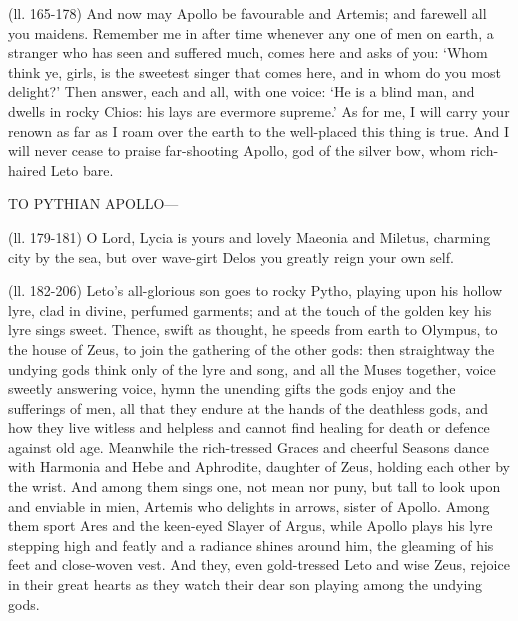 (ll. 165-178) And now may Apollo be favourable and Artemis; and farewell all
you maidens. Remember me in after time whenever any one of men on earth, a
stranger who has seen and suffered much, comes here and asks of you:
‘Whom think ye, girls, is the sweetest singer that comes here, and in
whom do you most delight?’ Then answer, each and all, with one voice:
‘He is a blind man, and dwells in rocky Chios: his lays are evermore
supreme.’ As for me, I will carry your renown as far as I roam over the
earth to the well-placed this thing is true. And I will never cease to praise
far-shooting Apollo, god of the silver bow, whom rich-haired Leto bare.

TO PYTHIAN APOLLO—

(ll. 179-181) O Lord, Lycia is yours and lovely Maeonia and Miletus, charming
city by the sea, but over wave-girt Delos you greatly reign your own self.

(ll. 182-206) Leto’s all-glorious son goes to rocky Pytho, playing upon
his hollow lyre, clad in divine, perfumed garments; and at the touch of the
golden key his lyre sings sweet. Thence, swift as thought, he speeds from earth
to Olympus, to the house of Zeus, to join the gathering of the other gods: then
straightway the undying gods think only of the lyre and song, and all the Muses
together, voice sweetly answering voice, hymn the unending gifts the gods enjoy
and the sufferings of men, all that they endure at the hands of the deathless
gods, and how they live witless and helpless and cannot find healing for death
or defence against old age. Meanwhile the rich-tressed Graces and cheerful
Seasons dance with Harmonia and Hebe and Aphrodite, daughter of Zeus, holding
each other by the wrist. And among them sings one, not mean nor puny, but tall
to look upon and enviable in mien, Artemis who delights in arrows, sister of
Apollo. Among them sport Ares and the keen-eyed Slayer of Argus, while Apollo
plays his lyre stepping high and featly and a radiance shines around him, the
gleaming of his feet and close-woven vest. And they, even gold-tressed Leto and
wise Zeus, rejoice in their great hearts as they watch their dear son playing
among the undying gods.

